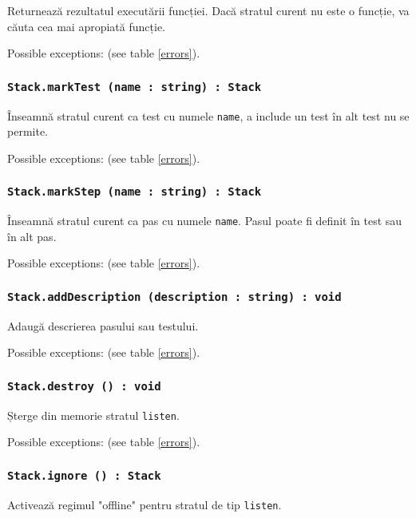 Returnează rezultatul executării funcției. Dacă stratul curent nu este o funcție, va căuta cea mai apropiată funcție.

Possible exceptions:  (see table \ref{errors}).

\subsubsection{\texttt{Stack.markTest (name : string) : Stack}}

Înseamnă stratul curent ca test cu numele \texttt{name}, a include un test în alt test nu se permite.

Possible exceptions:  (see table \ref{errors}).

\subsubsection{\texttt{Stack.markStep (name : string) : Stack}}

Înseamnă stratul curent ca pas cu numele \texttt{name}. Pasul poate fi definit în test sau în alt pas.

Possible exceptions:  (see table \ref{errors}).

\subsubsection{\texttt{Stack.addDescription (description : string) : void}}

Adaugă descrierea pasului sau testului.

Possible exceptions:  (see table \ref{errors}).

\subsubsection{\texttt{Stack.destroy () : void}}

Șterge din memorie stratul \texttt{listen}.

Possible exceptions:  (see table \ref{errors}).

\subsubsection{\texttt{Stack.ignore () : Stack}}

Activează regimul "offline" pentru stratul de tip \texttt{listen}.


